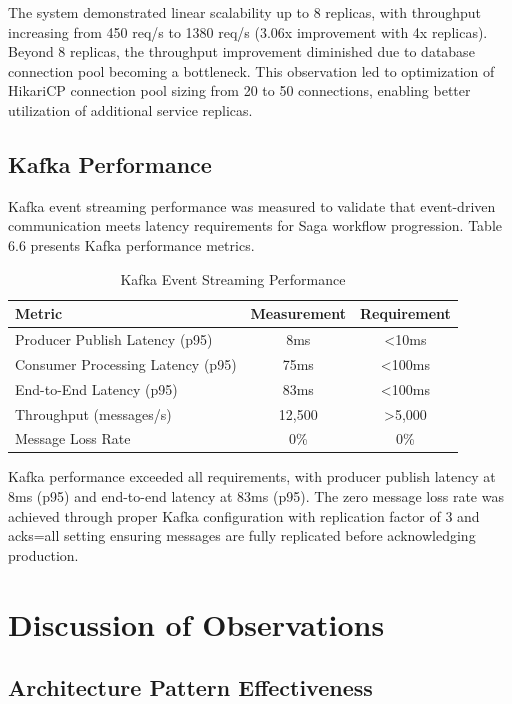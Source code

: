 The system demonstrated linear scalability up to 8 replicas, with throughput increasing from 450 req/s to 1380 req/s (3.06x improvement with 4x replicas). Beyond 8 replicas, the throughput improvement diminished due to database connection pool becoming a bottleneck. This observation led to optimization of HikariCP connection pool sizing from 20 to 50 connections, enabling better utilization of additional service replicas.

\subsection{Kafka Performance}

Kafka event streaming performance was measured to validate that event-driven communication meets latency requirements for Saga workflow progression. Table 6.6 presents Kafka performance metrics.

\begin{table}[h]
\centering
\caption{Kafka Event Streaming Performance}
\begin{tabular}{|l|c|c|}
\hline
\textbf{Metric} & \textbf{Measurement} & \textbf{Requirement} \\
\hline
Producer Publish Latency (p95) & 8ms & <10ms \\
Consumer Processing Latency (p95) & 75ms & <100ms \\
End-to-End Latency (p95) & 83ms & <100ms \\
Throughput (messages/s) & 12,500 & >5,000 \\
Message Loss Rate & 0\% & 0\% \\
\hline
\end{tabular}
\end{table}

Kafka performance exceeded all requirements, with producer publish latency at 8ms (p95) and end-to-end latency at 83ms (p95). The zero message loss rate was achieved through proper Kafka configuration with replication factor of 3 and acks=all setting ensuring messages are fully replicated before acknowledging production.

\section{Discussion of Observations}

\subsection{Architecture Pattern Effectiveness}

